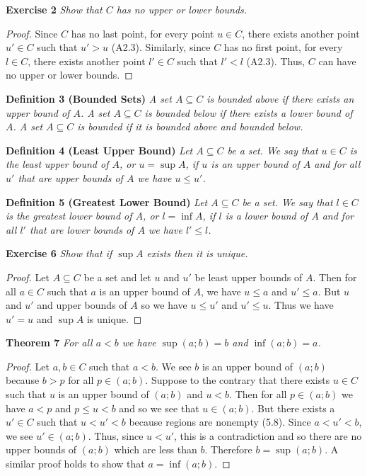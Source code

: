 \documentclass{article}
\begin{document}
\begin{flushleft}
\textbf{Exercise 2}
\textsl{Show that $C$ has no upper or lower bounds.}
\begin{proof}
Since $C$ has no last point, for every point $u \in C$, there exists another point $u' \in C$ such that $u'>u$ (A2.3). Similarly, since $C$ has no first point, for every $l \in C$, there exists another point $l' \in C$ such that $l'<l$ (A2.3). Thus, $C$ can have no upper or lower bounds.
\end{proof}

\textbf{Definition 3 (Bounded Sets)}
\textsl{A set $A \subseteq C$ is bounded above if there exists an upper bound of $A$. A set $A \subseteq C$ is bounded below if there exists a lower bound of $A$. A set $A \subseteq C$ is bounded if it is bounded above and bounded below.}\newline

\textbf{Definition 4 (Least Upper Bound)}
\textsl{Let $A \subseteq C$ be a set. We say that $u \in C$ is the least upper bound of $A$, or $u = \sup A$, if $u$ is an upper bound of $A$ and for all $u'$ that are upper bounds of $A$ we have $u \leq u'$.}\newline

\textbf{Definition 5 (Greatest Lower Bound)}
\textsl{Let $A \subseteq C$ be a set. We say that $l \in C$ is the greatest lower bound of $A$, or $l = \inf A$, if $l$ is a lower bound of $A$ and for all $l'$ that are lower bounds of $A$ we have $l' \leq l$.}
\newline

\textbf{Exercise 6}
\textsl{Show that if $\sup A$ exists then it is unique.}
\begin{proof}
Let $A \subseteq C$ be a set and let $u$ and $u'$ be least upper bounds of $A$. Then for all $a \in C$ such that $a$ is an upper bound of $A$, we have $u \leq a$ and $u' \leq a$. But $u$ and $u'$ and upper bounds of $A$ so we have $u \leq u'$ and $u' \leq u$. Thus we have $u' = u$ and $\sup A$ is unique.
\end{proof}

\textbf{Theorem 7}
\textsl{For all $a < b$ we have $\sup (a;b) = b$ and $\inf (a;b) = a$.}
\begin{proof}
Let $a,b \in C$ such that $a < b$. We see $b$ is an upper bound of $(a;b)$ because $b>p$ for all $p \in (a;b)$. Suppose to the contrary that there exists $u \in C$ such that $u$ is an upper bound of $(a;b)$ and $u < b$. Then for all $p \in (a;b)$ we have $a<p$ and $p \leq u<b$ and so we see that $u \in (a;b)$. But there exists a $u' \in C$ such that $u < u' < b$ because regions are nonempty (5.8). Since $a<u'<b$, we see $u' \in (a;b)$. Thus, since $u<u'$, this is a contradiction and so there are no upper bounds of $(a;b)$ which are less than $b$. Therefore $b = \sup (a;b)$. A similar proof holds to show that $a = \inf (a;b)$.
\end{proof}


\end{flushleft}
\end{document}
